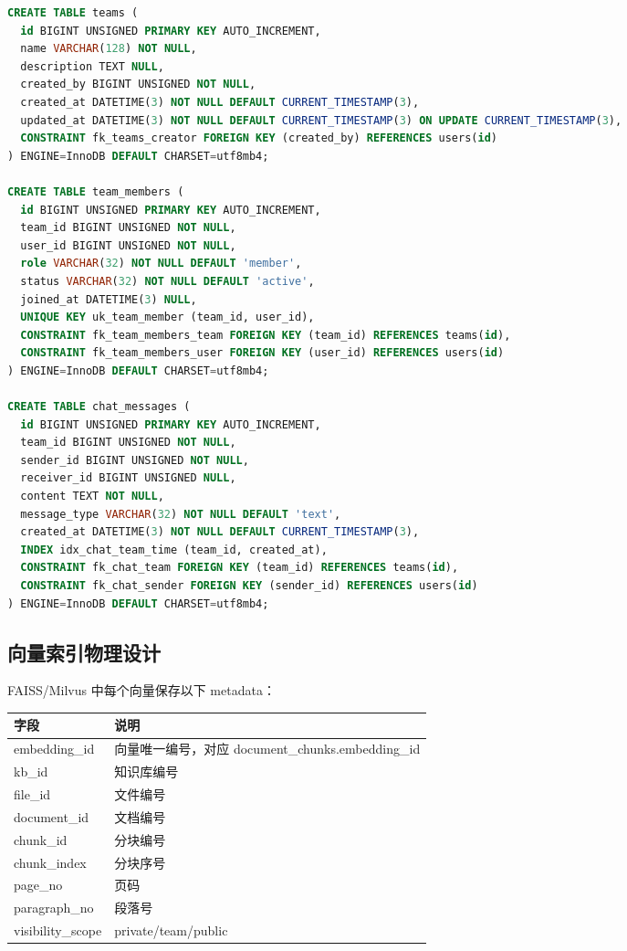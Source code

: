 \documentclass[a4paper,zihao=-4]{ctexart}
\begin{document}
\begin{lstlisting}[language=SQL]
CREATE TABLE teams (
  id BIGINT UNSIGNED PRIMARY KEY AUTO_INCREMENT,
  name VARCHAR(128) NOT NULL,
  description TEXT NULL,
  created_by BIGINT UNSIGNED NOT NULL,
  created_at DATETIME(3) NOT NULL DEFAULT CURRENT_TIMESTAMP(3),
  updated_at DATETIME(3) NOT NULL DEFAULT CURRENT_TIMESTAMP(3) ON UPDATE CURRENT_TIMESTAMP(3),
  CONSTRAINT fk_teams_creator FOREIGN KEY (created_by) REFERENCES users(id)
) ENGINE=InnoDB DEFAULT CHARSET=utf8mb4;

CREATE TABLE team_members (
  id BIGINT UNSIGNED PRIMARY KEY AUTO_INCREMENT,
  team_id BIGINT UNSIGNED NOT NULL,
  user_id BIGINT UNSIGNED NOT NULL,
  role VARCHAR(32) NOT NULL DEFAULT 'member',
  status VARCHAR(32) NOT NULL DEFAULT 'active',
  joined_at DATETIME(3) NULL,
  UNIQUE KEY uk_team_member (team_id, user_id),
  CONSTRAINT fk_team_members_team FOREIGN KEY (team_id) REFERENCES teams(id),
  CONSTRAINT fk_team_members_user FOREIGN KEY (user_id) REFERENCES users(id)
) ENGINE=InnoDB DEFAULT CHARSET=utf8mb4;

CREATE TABLE chat_messages (
  id BIGINT UNSIGNED PRIMARY KEY AUTO_INCREMENT,
  team_id BIGINT UNSIGNED NOT NULL,
  sender_id BIGINT UNSIGNED NOT NULL,
  receiver_id BIGINT UNSIGNED NULL,
  content TEXT NOT NULL,
  message_type VARCHAR(32) NOT NULL DEFAULT 'text',
  created_at DATETIME(3) NOT NULL DEFAULT CURRENT_TIMESTAMP(3),
  INDEX idx_chat_team_time (team_id, created_at),
  CONSTRAINT fk_chat_team FOREIGN KEY (team_id) REFERENCES teams(id),
  CONSTRAINT fk_chat_sender FOREIGN KEY (sender_id) REFERENCES users(id)
) ENGINE=InnoDB DEFAULT CHARSET=utf8mb4;
\end{lstlisting}

\hypertarget{ux5411ux91cfux7d22ux5f15ux7269ux7406ux8bbeux8ba1}{%
\subsection{向量索引物理设计}\label{ux5411ux91cfux7d22ux5f15ux7269ux7406ux8bbeux8ba1}}

FAISS/Milvus 中每个向量保存以下 metadata：

\begin{longtable}{|>{\raggedright\arraybackslash}p{2.4cm}|>{\raggedright\arraybackslash}p{\dimexpr(\linewidth-2.4cm-4\tabcolsep-3\arrayrulewidth)/1\relax}|}
\hline
字段 & 说明\tabularnewline
\hline
\endhead
embedding\_id & 向量唯一编号，对应 document\_chunks.embedding\_id\tabularnewline
\hline
kb\_id & 知识库编号\tabularnewline
\hline
file\_id & 文件编号\tabularnewline
\hline
document\_id & 文档编号\tabularnewline
\hline
chunk\_id & 分块编号\tabularnewline
\hline
chunk\_index & 分块序号\tabularnewline
\hline
page\_no & 页码\tabularnewline
\hline
paragraph\_no & 段落号\tabularnewline
\hline
visibility\_scope & private/team/public\tabularnewline
\hline
\end{longtable}
\end{document}

